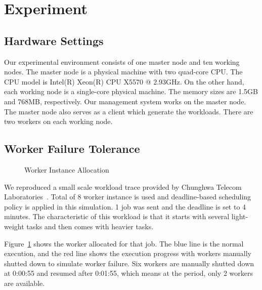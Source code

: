 \section{Experiment}\label{sec:exp}

\subsection{Hardware Settings}

Our experimental environment consists of one master node and ten working nodes.
The master node is a physical machine with two quad-core CPU.
The CPU model is Intel(R) Xeon(R) CPU X5570 @ 2.93GHz.
On the other hand, each working node is a single-core physical machine.
The memory sizes are 1.5GB and 768MB, respectively.
Our management system works on the master node.
The master node also serves as a client which generate the workloads.
There are two workers on each working node.

\subsection{Worker Failure Tolerance}

\begin{figure}
  \caption{Worker Instance Allocation}
  \label{figure:worker-failure}
\end{figure}

We reproduced a small scale workload trace provided by Chunghwa Telecom
Laboratories~\cite{cite:CHT}.
Total of 8 worker instance is used and deadline-based scheduling policy
is applied in this simulation. 
1 job was sent and the deadline is set to 4 minutes.
The characteristic of this workload is that it starts with several
light-weight tasks and then comes with heavier tasks.

Figure~\ref{figure:worker-failure} shows the worker allocated for that
job.
The blue line is the normal execution, and the red line shows the
execution progress with workers manually shutted down to simulate worker
failure.
Six workers are manually shutted down at 0:00:55 and resumed after
0:01:55, which means at the period, only 2 workers are available.

